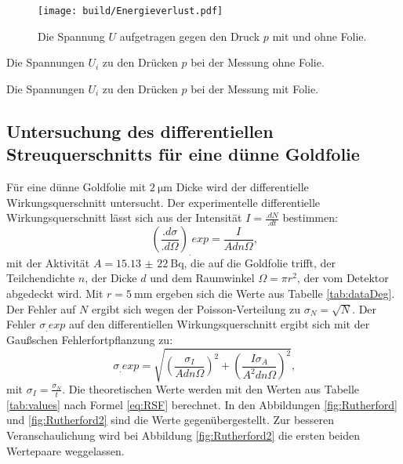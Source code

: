 \begin{figure}
\centering
\texttt{[image: build/Energieverlust.pdf]}
\caption{Die Spannung $U$ aufgetragen gegen den Druck $p$ mit und ohne Folie.}
\label{fig:Foliendicke}
\end{figure}

\begin{table}
	\centering
	\caption{Die Spannungen $U_i$ zu den Drücken $p$ bei der Messung ohne Folie.}
	
	\label{tab:dataOhne}
\end{table}

\begin{table}
	\centering
	\caption{Die Spannungen $U_i$ zu den Drücken $p$ bei der Messung mit Folie.}
	
	\label{tab:dataMit}
\end{table}

\subsection{Untersuchung des differentiellen Streuquerschnitts für eine dünne Goldfolie}

Für eine dünne Goldfolie mit $\SI{2}{\micro\metre}$ Dicke wird der differentielle Wirkungsquerschnitt untersucht.
Der experimentelle differentielle Wirkungsquerschnitt lässt sich aus der Intensität $I=\frac{.dN}{.dt}$ bestimmen:
\begin{equation}
\left(\frac{.d\sigma}{.d\Omega}\right)_.{exp} = \frac{I}{Adn\Omega}\text{,}\label{eq:Rutherford}
\end{equation}
mit der Aktivität $A=\SI{15,13(22)}{\becquerel}$, die auf die Goldfolie trifft, der Teilchendichte $n$, der Dicke $d$ und dem Raumwinkel $\Omega=\pi r^2$, der vom Detektor abgedeckt wird. Mit $r=\SI{5}{\milli\metre}$ ergeben sich die Werte aus Tabelle \ref{tab:dataDeg}. Der Fehler auf $N$ ergibt sich wegen der Poisson-Verteilung zu $\sigma_N= \sqrt{N}$.
Der Fehler $\sigma_.{exp}$ auf den differentiellen Wirkungsquerschnitt ergibt sich mit der Gaußschen Fehlerfortpflanzung zu:
\begin{equation}
\sigma_.{exp} =\sqrt{\left(\frac{\sigma_I}{Adn\Omega}\right)^2+\left(\frac{I\sigma_A}{A^2dn\Omega}\right)^2} 
\text{,}\label{eq:errorRutherford}
\end{equation}
mit $\sigma_I=\frac{\sigma_N}{t}$.
Die theoretischen Werte werden mit den Werten aus Tabelle \ref{tab:values} nach Formel \eqref{eq:RSF} berechnet. In  den Abbildungen \ref{fig:Rutherford} und \ref{fig:Rutherford2} sind die Werte gegenübergestellt. Zur besseren Veranschaulichung wird bei Abbildung \ref{fig:Rutherford2} die ersten beiden Wertepaare weggelassen.\\
 
